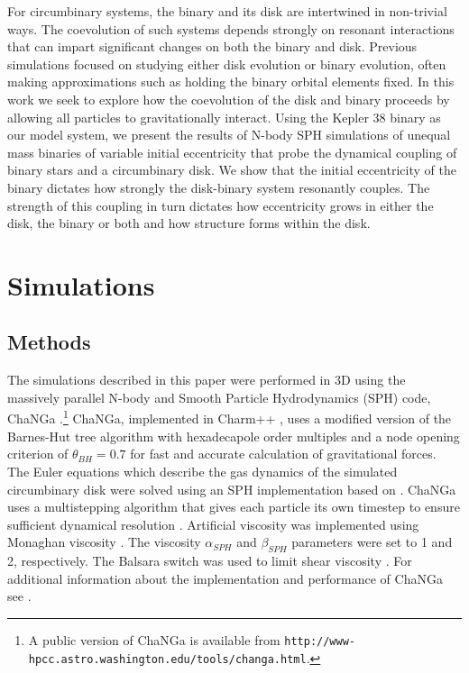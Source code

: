 For circumbinary systems, the binary and its disk are intertwined in
non-trivial ways.  The coevolution of such systems depends strongly on
resonant interactions that can impart significant changes on both the
binary and disk.  Previous simulations focused on studying either disk evolution or binary evolution, often making approximations
such as holding the binary orbital elements fixed.  In this work we seek to explore how the coevolution
of the disk and binary proceeds by allowing all particles to gravitationally interact.  
Using the Kepler 38 binary as our model system, we present the results of N-body
SPH simulations of unequal mass binaries of variable initial eccentricity 
that probe the dynamical coupling of binary stars and a circumbinary disk.  
We show that the initial eccentricity of the binary dictates how strongly the disk-binary system resonantly couples.
The strength of this coupling in turn dictates how eccentricity grows in either the disk, the binary or both and how structure 
forms within the disk.

\section{Simulations}

\subsection{Methods} \label{CBDisk:sec:methods_section}

The simulations described in this paper were performed in 3D using the massively parallel N-body 
and Smooth Particle Hydrodynamics (SPH) code, ChaNGa
\citep{Menon2015}.\footnote{A public version of ChaNGa is available
  from {\tt http://www-hpcc.astro.washington.edu/tools/changa.html}.}
ChaNGa, implemented in Charm++ \citep{Kale1996}, uses a modified version of the Barnes-Hut tree algorithm with hexadecapole 
order multiples and a node opening criterion of $\theta_{BH} =
  0.7$ for fast and accurate calculation of gravitational forces.  The Euler equations which describe
the gas dynamics of the simulated circumbinary disk were solved using an SPH implementation based on
\citet{Wadsley2004}.  ChaNGa uses a multistepping algorithm that gives
each particle its own timestep to ensure sufficient dynamical
resolution \citep{Quinn1997}.  Artificial viscosity was implemented using
Monaghan viscosity \citep{Monaghan1983}.  The viscosity $\alpha_{SPH}$
  and $\beta_{SPH}$ parameters were set to 1 and 2, respectively.  The Balsara switch was used to limit shear viscosity \citep{Balsara1995}.  For additional information about the implementation and performance of ChaNGa see \citet{Jetley2008}.

